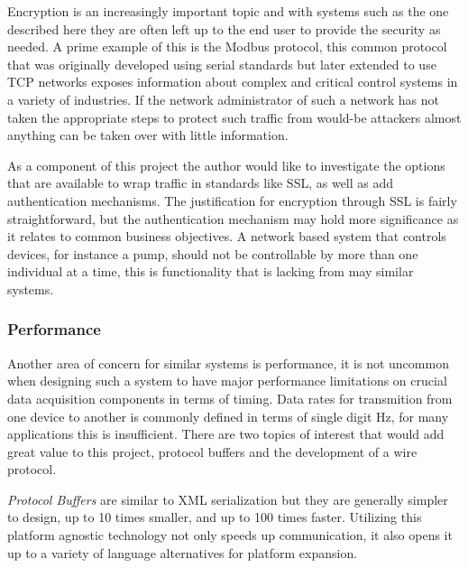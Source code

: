 \documentclass[11pt]{article}
\begin{document}
        Encryption is an increasingly important topic and with systems such as
        the one described here they are often left up to the end user to provide
        the security as needed. A prime example of this is the Modbus protocol,
        this common protocol that was originally developed using serial
        standards but later extended to use TCP networks exposes information
        about complex and critical control systems in a variety of industries.
        If the network administrator of such a network has not taken the
        appropriate steps to protect such traffic from would-be attackers almost
        anything can be taken over with little information.

        As a component of this project the author would like to investigate the
        options that are available to wrap traffic in standards like SSL, as
        well as add authentication mechanisms. The justification for encryption
        through SSL is fairly straightforward, but the authentication mechanism
        may hold more significance as it relates to common business objectives.
        A network based system that controls devices, for instance a pump,
        should not be controllable by more than one individual at a time, this
        is functionality that is lacking from may similar systems.

      \subsubsection{Performance}\label{sec:soln-innov-perf}

        Another area of concern for similar systems is performance, it is not
        uncommon when designing such a system to have major performance
        limitations on crucial data acquisition components in terms of timing.
        Data rates for transmition from one device to another is commonly
        defined in terms of single digit Hz, for many applications this is
        insufficient. There are two topics of interest that would add great
        value to this project, protocol buffers and the development of a wire
        protocol.

        \emph{Protocol Buffers} are similar to XML serialization but they are
        generally simpler to design, up to 10 times smaller, and up to 100 times
        faster. Utilizing this platform agnostic technology not only speeds up
        communication, it also opens it up to a variety of language alternatives
        for platform expansion.
\end{document}
